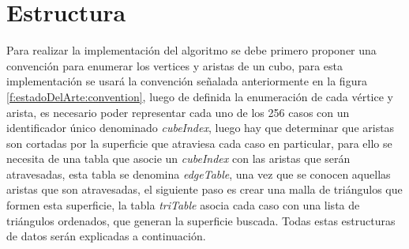 \section{Estructura}
\label{ch:implementacion:sec:estructura}

Para realizar la implementación del algoritmo se debe primero proponer una convención para enumerar los vertices y aristas de un cubo, para esta implementación se usará la convención señalada anteriormente en la figura \ref{f:estadoDelArte:convention}, luego de definida la enumeración de cada vértice y arista, es necesario poder representar cada uno de los 256 casos con un identificador único denominado \emph{cubeIndex}, luego hay que determinar que aristas son cortadas por la superficie que atraviesa cada caso en particular, para ello se necesita de una tabla que asocie un \emph{cubeIndex} con las aristas que serán atravesadas, esta tabla se denomina \emph{edgeTable}, una vez que se conocen aquellas aristas que son atravesadas, el siguiente paso es crear una malla de triángulos que formen esta superficie, la tabla \emph{triTable} asocia cada caso con una lista de triángulos ordenados, que generan la superficie buscada. Todas estas estructuras de datos serán explicadas a continuación.